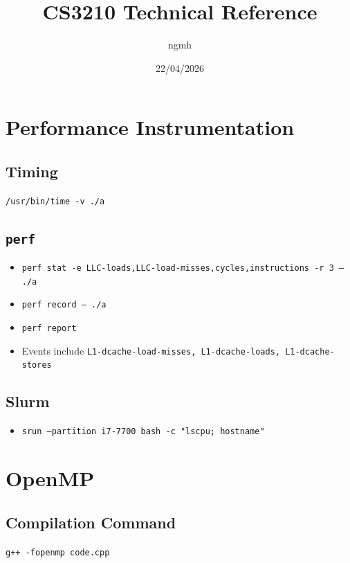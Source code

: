 \documentclass{article}
\title{CS3210 Technical Reference}
\author{ngmh}
\date{22/04/2026}
\begin{document}
\maketitle

\section{Performance Instrumentation}

\subsection{Timing}
\texttt{/usr/bin/time -v ./a}

\subsection{\texttt{perf}}
\begin{itemize}
    \item 
\texttt{perf stat -e LLC-loads,LLC-load-misses,cycles,instructions -r 3 -- ./a}
    \item 
\texttt{perf record -- ./a}
    \item 
\texttt{perf report}
    \item Events include \texttt{L1-dcache-load-misses, L1-dcache-loads, L1-dcache-stores}
\end{itemize}

\subsection{Slurm}
\begin{itemize}
    \item \texttt{srun --partition i7-7700 bash -c "lscpu; hostname"}
\end{itemize}

\section{OpenMP}

\subsection{Compilation Command}
\texttt{g++ -fopenmp code.cpp}
\end{document}
